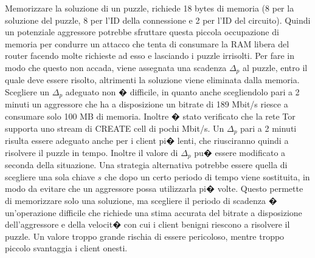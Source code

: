 Memorizzare la soluzione di un puzzle, richiede 18 bytes di memoria (8 per la soluzione del puzzle, 8 per l'ID della connessione e 2 per l'ID del circuito). Quindi un potenziale aggressore potrebbe sfruttare questa piccola occupazione di memoria per condurre un attacco che tenta di consumare la RAM libera del router facendo molte richieste ad esso e lasciando i puzzle irrisolti. Per fare in modo che questo non accada, viene assegnata una scadenza $\Delta_{p}$ al puzzle, entro il quale deve essere risolto, altrimenti la soluzione viene eliminata dalla memoria. Scegliere un $\Delta_{p}$ adeguato non � difficile, in quanto anche scegliendolo pari a 2 minuti un aggressore che ha a disposizione un bitrate di 189 Mbit/s riesce a consumare solo 100 MB di memoria. Inoltre � stato verificato che la rete Tor supporta uno stream di {\ttfamily CREATE} cell di pochi Mbit/s. Un $\Delta_{p}$ pari a 2 minuti risulta essere adeguato anche per i client pi� lenti, che riusciranno quindi a risolvere il puzzle in tempo. Inoltre il valore di $\Delta_{p}$ pu� essere modificato a seconda della situazione. Una strategia alternativa potrebbe essere quella di scegliere una sola chiave $s$ che dopo un certo periodo di tempo viene sostituita, in modo da evitare che un aggressore possa utilizzarla pi� volte. Questo permette di memorizzare solo una soluzione, ma scegliere il periodo di scadenza � un'operazione difficile che richiede una stima accurata del bitrate a disposizione dell'aggressore e della velocit� con cui i client benigni riescono a risolvere il puzzle. Un valore troppo grande rischia di essere pericoloso, mentre troppo piccolo svantaggia i client onesti.


